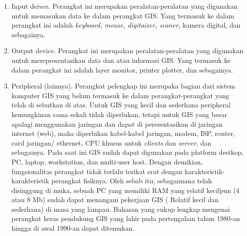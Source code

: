 \begin{enumerate}
\item Input deivce. Perangkat ini merupakan peralatan-peralatan yang digunakan untuk memasukan data ke dalam perangkat GIS. Yang termasuk ke dalam perangkat ini adalah \textit{keyboard, mouse, digitaizer, scaner,} kamera digital, dan sebagainya.
\item Output device. Perangkat ini merupakan peralatan-peralatan yang digunakan untuk merepresentasikan data dan atau informasi GIS. Yang termasuk ke dalam perangkat ini adalah layer monitor, printer plotter, dan sebagainya.
\item Peripheral (lainnya). Perangkat pelengkap ini merupaka bagian dari sistem komputer GIS yang belum termasuk ke dalam perangkat-perangkat yang telah di sebutkan di atas. Untuk GIS yang kecil dan sederhana peripheral kemungkinan sama sekali tidak diperlukan, tetapi untuk GIS yang besar apalagi menggunakan jaringan dan dapat di peresentasikan di jaringan internet (web), maka diperlukan kabel-kabel jaringan, modem, ISP, router, card jaringan/ ethernet, CPU khusus untuk \textit{clients} dan \textit{server}, dan sebagainya.
Pada saat ini GIS sudah dapat digunakan pada platform destkop, PC, laptop, workstation, dan multi-user host. Dengan demikian, fungsionalitas perangkat tidak terlalu terikat erat dengan karakteristik-karakteristik perangkat fisiknya. Oleh sebab itu, sebagaimana telah disinggung di muka, sebuah PC yang memiliki RAM yang relatif kecilpun (4 atau 8 Mb) sudah dapat menangani pekerjaan GIS ( Relatif kecil dan sederhana) di masa yang lampau. Bahasan yang cukup lengkap mengenai perangkat keras pendukung GIS yang lahir pada pertengahan tahun 1980-an hingga di awal 1990-an dapat ditemukan.
\end{enumerate}
